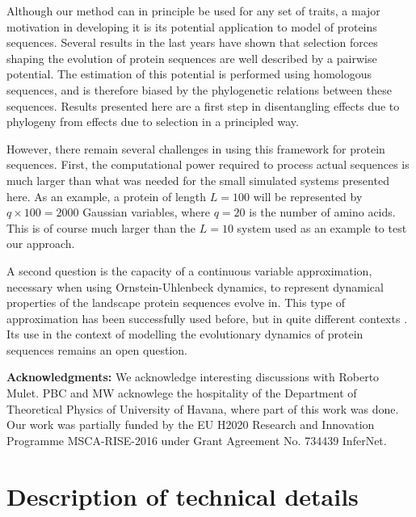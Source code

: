 \documentclass[preprint,amsmath,amssymb,superscriptaddress,showpacs,pre]{revtex4-1}
\begin{document}
Although our method can in principle be used for any set of traits, a major motivation in developing it is its potential application to model of proteins sequences. 
Several results in the last years have shown that selection forces shaping the evolution of protein sequences are well described by a pairwise potential. 
The estimation of this potential is performed using homologous sequences, and is therefore biased by the phylogenetic relations between these sequences.  
Results presented here are a first step in disentangling effects due to phylogeny from effects due to selection in a principled way. 

However, there remain several challenges in using this framework for protein sequences. 
First, the computational power required to process actual sequences is much larger than what was needed for the small simulated systems presented here. 
As an example, a protein of length $L=100$ will be represented by $q\times 100=2000$ Gaussian variables, where $q=20$ is the number of amino acids. 
This is of course much larger than the $L=10$ system used as an example to test our approach. 

A second question is the capacity of a continuous variable approximation, necessary when using Ornstein-Uhlenbeck dynamics, to represent dynamical properties of the landscape protein sequences evolve in. 
This type of approximation has been successfully used before, but in quite different contexts \cite{jones_psicov_2012,barton_large_2014,baldassi_fast_2014}. 
Its use in the context of modelling the evolutionary dynamics of protein sequences remains an open question. 


\textbf{Acknowledgments:} We acknowledge interesting discussions with Roberto Mulet. PBC and MW acknowlege the hospitality of the Department of  Theoretical  Physics of University  of  Havana, where part of this work was done. Our work was partially funded by the EU H2020 Research and Innovation Programme MSCA-RISE-2016 under Grant
Agreement No. 734439 InferNet.


\clearpage



\newpage
\appendix

\section{Description of technical details} %
\label{sec:supplementary_material}
\end{document}
